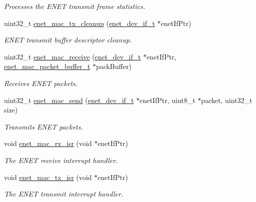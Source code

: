 \begin{DoxyCompactItemize}
\begin{DoxyCompactList}\small\item\em Processes the E\+N\+ET transmit frame statistics. \end{DoxyCompactList}\item 
uint32\+\_\+t \hyperlink{group__enet__driver_ga24822e4f69a80e943dee73b60f348e15}{enet\+\_\+mac\+\_\+tx\+\_\+cleanup} (\hyperlink{group__enet__driver_ga497f30fbc93952e93d9fb8cf78480b75}{enet\+\_\+dev\+\_\+if\+\_\+t} $\ast$enet\+If\+Ptr)
\begin{DoxyCompactList}\small\item\em E\+N\+ET transmit buffer descriptor cleanup. \end{DoxyCompactList}\item 
uint32\+\_\+t \hyperlink{group__enet__driver_gaf560bd784dd43b28dda25806f9613bcf}{enet\+\_\+mac\+\_\+receive} (\hyperlink{group__enet__driver_ga497f30fbc93952e93d9fb8cf78480b75}{enet\+\_\+dev\+\_\+if\+\_\+t} $\ast$enet\+If\+Ptr, \hyperlink{group__enet__driver_gac8cd75bf78539c0237a1895b5b573557}{enet\+\_\+mac\+\_\+packet\+\_\+buffer\+\_\+t} $\ast$pack\+Buffer)
\begin{DoxyCompactList}\small\item\em Receives E\+N\+ET packets. \end{DoxyCompactList}\item 
uint32\+\_\+t \hyperlink{group__enet__driver_ga183a80197e5b737b47db214df27c91f1}{enet\+\_\+mac\+\_\+send} (\hyperlink{group__enet__driver_ga497f30fbc93952e93d9fb8cf78480b75}{enet\+\_\+dev\+\_\+if\+\_\+t} $\ast$enet\+If\+Ptr, uint8\+\_\+t $\ast$packet, uint32\+\_\+t size)
\begin{DoxyCompactList}\small\item\em Transmits E\+N\+ET packets. \end{DoxyCompactList}\item 
void \hyperlink{group__enet__driver_gad146858061fda11f4d781051f1632440}{enet\+\_\+mac\+\_\+rx\+\_\+isr} (void $\ast$enet\+If\+Ptr)
\begin{DoxyCompactList}\small\item\em The E\+N\+ET receive interrupt handler. \end{DoxyCompactList}\item 
void \hyperlink{group__enet__driver_ga1bbea8e739044d04c3df22edf57a196a}{enet\+\_\+mac\+\_\+tx\+\_\+isr} (void $\ast$enet\+If\+Ptr)
\begin{DoxyCompactList}\small\item\em The E\+N\+ET transmit interrupt handler. \end{DoxyCompactList}\item 

\end{DoxyCompactItemize}
